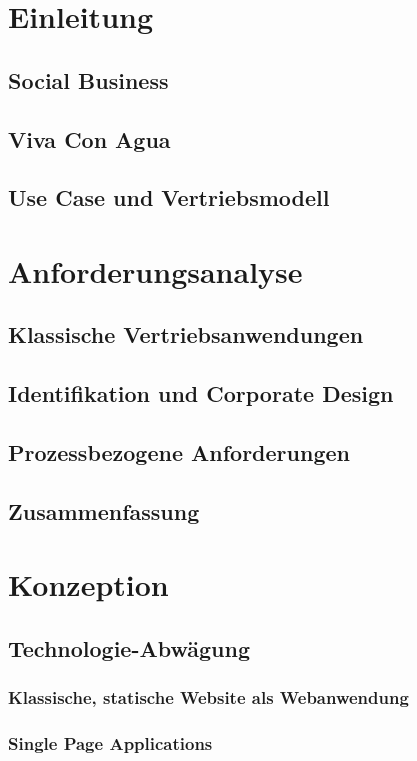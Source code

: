 \chapter{Einleitung}
\section{Social Business}
\section{Viva Con Agua}
\section{Use Case und Vertriebsmodell}

\chapter{Anforderungsanalyse}
\section{Klassische Vertriebsanwendungen}
\section{Identifikation und Corporate Design}
\section{Prozessbezogene Anforderungen}
\section{Zusammenfassung}

\chapter{Konzeption}
\section{Technologie-Abwägung}
\subsection{Klassische, statische Website als Webanwendung}
\subsection{Single Page Applications}
